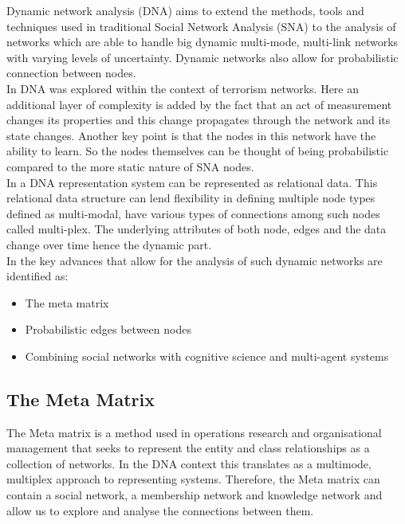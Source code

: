 Dynamic network analysis (DNA) aims to extend the methods, tools and techniques used in traditional Social Network Analysis (SNA) to the analysis of networks which are able to handle big dynamic multi-mode, multi-link networks with varying levels of uncertainty.  Dynamic networks also allow for probabilistic connection between nodes. \cite{Carley2001,Carley2007}\\

In \citeauthor{Carley2007}\cite{Carley2007} DNA was explored within the context of terrorism networks. Here an additional layer of complexity is added by the fact that an act of measurement changes its properties and this change propagates through the network and its state changes. Another key point is that the nodes in this network have the ability to learn. So the nodes themselves can be thought of being probabilistic compared to the more static nature of SNA nodes. \\

In a DNA representation system can be represented as relational data. This relational data structure can lend flexibility in defining multiple node types defined as multi-modal, have various types of connections among such nodes called multi-plex. The underlying attributes of both node, edges and the data change over time hence the dynamic part. \cite{Carley2007}\\

In \citeauthor{Carley2007}\cite{Carley2007} the key advances that allow for the analysis of such dynamic networks are identified as:

\begin{itemize}
    \item The meta matrix
    \item Probabilistic edges between nodes
    \item Combining social networks with cognitive science and multi-agent systems
\end{itemize}

\subsection{The Meta Matrix}
The Meta matrix is a method used in operations research and organisational management that seeks to represent the entity and class relationships as a collection of networks. In the DNA context this translates as a multimode, multiplex approach to representing systems. Therefore, the Meta matrix can contain a social network, a membership network and knowledge network and allow us to explore and analyse the connections between them. \cite{Carley2001, Carley2007, Snijders2015}

